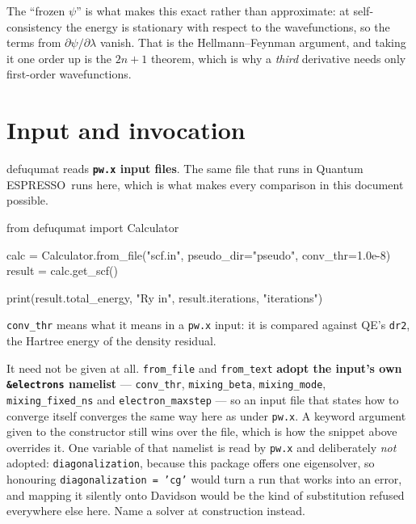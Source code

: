 \documentclass[11pt,a4paper]{article}
\newcommand{\qe}{Quantum ESPRESSO}
\newcommand{\code}[1]{\texttt{\small #1}}
\begin{document}
The ``frozen $\psi$'' is what makes this exact rather than approximate: at
self-consistency the energy is stationary with respect to the wavefunctions, so
the terms from $\partial\psi/\partial\lambda$ vanish. That is the
Hellmann--Feynman argument, and taking it one order up is the $2n{+}1$ theorem,
which is why a \emph{third} derivative needs only first-order wavefunctions.

\clearpage
\tableofcontents
\clearpage

\section{Input and invocation}

defuqumat reads \textbf{\code{pw.x} input files}. The same file that runs in
\qe\ runs here, which is what makes every comparison in this document possible.

\begin{pycode}
from defuqumat import Calculator

calc = Calculator.from_file("scf.in", pseudo_dir="pseudo", conv_thr=1.0e-8)
result = calc.get_scf()

print(result.total_energy, "Ry in", result.iterations, "iterations")
\end{pycode}

\code{conv\_thr} means what it means in a \code{pw.x} input: it is compared
against QE's \code{dr2}, the Hartree energy of the density residual.

It need not be given at all. \code{from\_file} and \code{from\_text}
\textbf{adopt the input's own \code{\&electrons} namelist} ---
\code{conv\_thr}, \code{mixing\_beta}, \code{mixing\_mode},
\code{mixing\_fixed\_ns} and \code{electron\_maxstep} --- so an input file
that states how to converge itself converges the same way here as under
\code{pw.x}. A keyword argument given to the constructor still wins over the
file, which is how the snippet above overrides it. One variable of that
namelist is read by \code{pw.x} and deliberately \emph{not} adopted:
\code{diagonalization}, because this package offers one eigensolver, so
honouring \code{diagonalization = 'cg'} would turn a run that works into an
error, and mapping it silently onto Davidson would be the kind of substitution
refused everywhere else here. Name a solver at construction instead.
\end{document}
